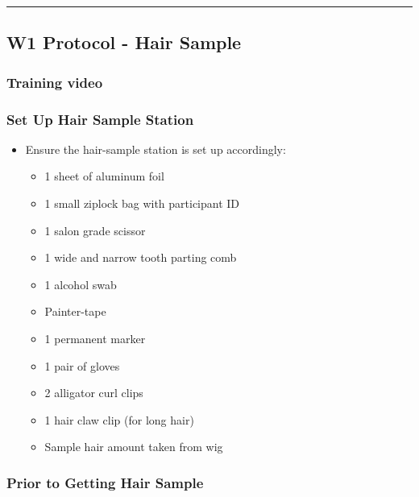 \documentclass[]{book}
\providecommand{\tightlist}{%
  \setlength{\itemsep}{0pt}\setlength{\parskip}{0pt}}
\begin{document}
\begin{center}\rule{0.5\linewidth}{0.5pt}\end{center}

\hypertarget{w1-protocol---hair-sample}{%
\subsection{W1 Protocol - Hair Sample}\label{w1-protocol---hair-sample}}

\hypertarget{training-video}{%
\subsubsection{Training video}\label{training-video}}

\hypertarget{set-up-hair-sample-station}{%
\subsubsection{Set Up Hair Sample Station}\label{set-up-hair-sample-station}}

\begin{itemize}
\tightlist
\item
  Ensure the hair-sample station is set up accordingly:

  \begin{itemize}
  \tightlist
  \item
    1 sheet of aluminum foil
  \item
    1 small ziplock bag with participant ID
  \item
    1 salon grade scissor
  \item
    1 wide and narrow tooth parting comb
  \item
    1 alcohol swab
  \item
    Painter-tape
  \item
    1 permanent marker
  \item
    1 pair of gloves
  \item
    2 alligator curl clips
  \item
    1 hair claw clip (for long hair)
  \item
    Sample hair amount taken from wig
  \end{itemize}
\end{itemize}

\hypertarget{prior-to-getting-hair-sample}{%
\subsubsection{Prior to Getting Hair Sample}\label{prior-to-getting-hair-sample}}
\end{document}
